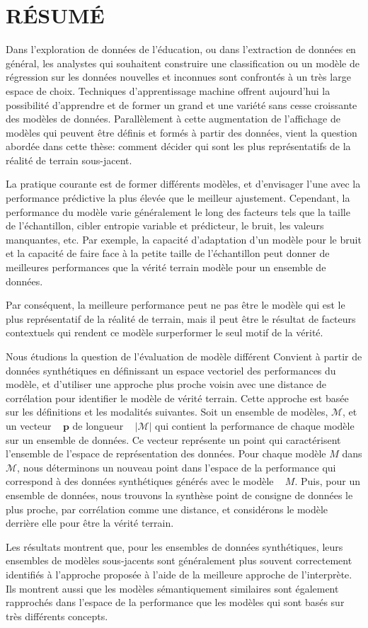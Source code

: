 \chapter*{RÉSUMÉ}\thispagestyle{headings}
Dans l'exploration de données de l'éducation, ou dans l'extraction de données en général, les analystes qui souhaitent construire une classification ou un modèle de régression sur les données nouvelles et inconnues sont confrontés à un très large espace de choix. Techniques d'apprentissage machine offrent aujourd'hui la possibilité d'apprendre et de former un grand et une variété sans cesse croissante des modèles de données. Parallèlement à cette augmentation de l'affichage de modèles qui peuvent être définis et formés à partir des données, vient la question abordée dans cette thèse: comment décider qui sont les plus représentatifs de la réalité de terrain sous-jacent.

La pratique courante est de former différents modèles, et d'envisager l'une avec la performance prédictive la plus élevée que le meilleur ajustement. Cependant, la performance du modèle varie généralement le long des facteurs tels que la taille de l'échantillon, cibler entropie variable et prédicteur, le bruit, les valeurs manquantes, etc. Par exemple, la capacité d'adaptation d'un modèle pour le bruit et la capacité de faire face à la petite taille de l'échantillon peut donner de meilleures performances que la vérité terrain modèle pour un ensemble de données.

Par conséquent, la meilleure performance peut ne pas être le modèle qui est le plus représentatif de la réalité de terrain, mais il peut être le résultat de facteurs contextuels qui rendent ce modèle surperformer le seul motif de la vérité.

Nous étudions la question de l'évaluation de modèle différent Convient à partir de données synthétiques en définissant un espace vectoriel des performances du modèle, et d'utiliser une approche plus proche voisin avec une distance de corrélation pour identifier le modèle de vérité terrain. Cette approche est basée sur les définitions et les modalités suivantes. Soit un ensemble de modèles, $\mathcal{M}$, et un vecteur ~ $\mathbf{p}$ de longueur ~ $|\mathcal{M}|$ qui contient la performance de chaque modèle sur un ensemble de données. Ce vecteur représente un point qui caractérisent l'ensemble de l'espace de représentation des données. Pour chaque modèle $M$ dans $\mathcal {M}$, nous déterminons un nouveau point dans l'espace de la performance qui correspond à des données synthétiques générés avec le modèle ~ $M$. Puis, pour un ensemble de données, nous trouvons la synthèse point de consigne de données le plus proche, par corrélation comme une distance, et considérons le modèle derrière elle pour être la vérité terrain.

Les résultats montrent que, pour les ensembles de données synthétiques, leurs ensembles de modèles sous-jacents sont généralement plus souvent correctement identifiés à l'approche proposée à l'aide de la meilleure approche de l'interprète. Ils montrent aussi que les modèles sémantiquement similaires sont également rapprochés dans l'espace de la performance que les modèles qui sont basés sur très différents concepts.